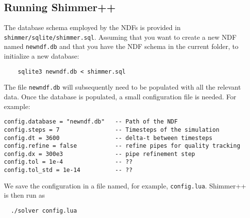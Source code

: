 
\subsection{Running Shimmer++}
The database schema employed by the NDFs is provided in \texttt{shimmer/sqlite/shimmer.sql}. Assuming that you want to create a new NDF named \texttt{newndf.db} and that you have the NDF schema in the current folder, to initialize a new database:
\begin{verbatim}
    sqlite3 newndf.db < shimmer.sql
\end{verbatim}
The file \texttt{newndf.db} will subsequently need to be populated with all the relevant data. Once the database is populated, a small configuration file is needed. For example:

\begin{verbatim}
config.database = "newndf.db"   -- Path of the NDF
config.steps = 7                -- Timesteps of the simulation
config.dt = 3600                -- delta-t between timesteps
config.refine = false           -- refine pipes for quality tracking
config.dx = 300e3               -- pipe refinement step
config.tol = 1e-4               -- ?? 
config.tol_std = 1e-14          -- ??
\end{verbatim}
We save the configuration in a file named, for example, \texttt{config.lua}. Shimmer++ is then
run as
\begin{verbatim}
  ./solver config.lua
\end{verbatim}

